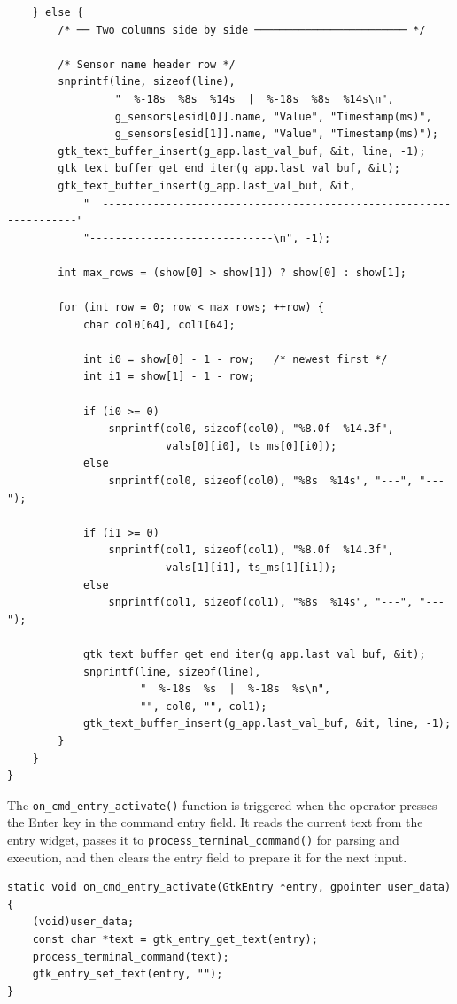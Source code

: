 \begin{verbatim}
    } else {
        /* ── Two columns side by side ──────────────────────── */

        /* Sensor name header row */
        snprintf(line, sizeof(line),
                 "  %-18s  %8s  %14s  |  %-18s  %8s  %14s\n",
                 g_sensors[esid[0]].name, "Value", "Timestamp(ms)",
                 g_sensors[esid[1]].name, "Value", "Timestamp(ms)");
        gtk_text_buffer_insert(g_app.last_val_buf, &it, line, -1);
        gtk_text_buffer_get_end_iter(g_app.last_val_buf, &it);
        gtk_text_buffer_insert(g_app.last_val_buf, &it,
            "  ------------------------------------------------------------------"
            "-----------------------------\n", -1);

        int max_rows = (show[0] > show[1]) ? show[0] : show[1];

        for (int row = 0; row < max_rows; ++row) {
            char col0[64], col1[64];

            int i0 = show[0] - 1 - row;   /* newest first */
            int i1 = show[1] - 1 - row;

            if (i0 >= 0)
                snprintf(col0, sizeof(col0), "%8.0f  %14.3f",
                         vals[0][i0], ts_ms[0][i0]);
            else
                snprintf(col0, sizeof(col0), "%8s  %14s", "---", "---");

            if (i1 >= 0)
                snprintf(col1, sizeof(col1), "%8.0f  %14.3f",
                         vals[1][i1], ts_ms[1][i1]);
            else
                snprintf(col1, sizeof(col1), "%8s  %14s", "---", "---");

            gtk_text_buffer_get_end_iter(g_app.last_val_buf, &it);
            snprintf(line, sizeof(line),
                     "  %-18s  %s  |  %-18s  %s\n",
                     "", col0, "", col1);
            gtk_text_buffer_insert(g_app.last_val_buf, &it, line, -1);
        }
    }
}
\end{verbatim}


The \texttt{on\_cmd\_entry\_activate()} function is triggered when the
operator presses the Enter key in the command entry field. It reads the
current text from the entry widget, passes it to
\texttt{process\_terminal\_command()} for parsing and execution, and
then clears the entry field to prepare it for the next input.
\begin{verbatim}
static void on_cmd_entry_activate(GtkEntry *entry, gpointer user_data) {
    (void)user_data;
    const char *text = gtk_entry_get_text(entry);
    process_terminal_command(text);
    gtk_entry_set_text(entry, "");
}
\end{verbatim}


